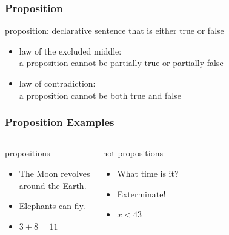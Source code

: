 \documentclass[dvipsnames]{beamer}
\begin{document}
\begin{frame}
  \frametitle{Proposition}

  \begin{definition}
    \alert{proposition}: declarative sentence that is either true or false
  \end{definition}

  \begin{itemize}
    \item law of the excluded middle:\\
      a proposition cannot be partially true or partially false

    \item law of contradiction:\\
      a proposition cannot be both true and false
  \end{itemize}
\end{frame}

\begin{frame}
  \frametitle{Proposition Examples}

  \begin{columns}[t]
    \begin{exampleblock}{propositions}
      \begin{itemize}
        \item The Moon revolves\\
          around the Earth.
        \item Elephants can fly.
        \item $3+8=11$
      \end{itemize}
    \end{exampleblock}

    \pause
    \begin{exampleblock}{not propositions}
      \begin{itemize}
        \item What time is it?
        \item Exterminate!
        \item $x<43$
      \end{itemize}
    \end{exampleblock}
  \end{columns}
\end{frame}
\end{document}
